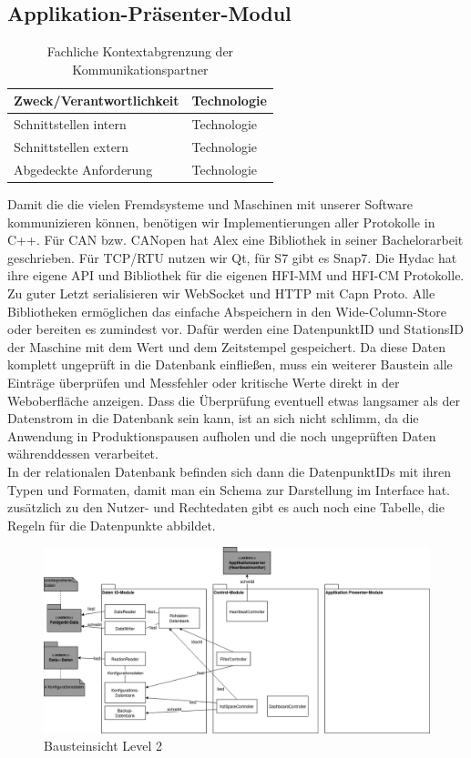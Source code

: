 \subsection{Applikation-Präsenter-Modul}
\begin{table}[th]
	\begin{tabularx}{\textwidth}{X X}
		\hline
		Zweck/Verantwortlichkeit & Technologie \\
		\hline
		Schnittstellen intern & Technologie \\
		\hline
		Schnittstellen extern & Technologie \\
		\hline
		Abgedeckte Anforderung & Technologie \\
		\hline
	\end{tabularx} 
	\caption{Fachliche Kontextabgrenzung der Kommunikationspartner}
	\label{tab:FachlicheKontextabgrenzungDerKommunikationspartner}
\end{table}
Damit die die vielen Fremdsysteme und Maschinen mit unserer Software kommunizieren können, benötigen wir Implementierungen aller Protokolle in C++. Für CAN bzw. CANopen hat Alex eine Bibliothek in seiner Bachelorarbeit geschrieben. Für TCP/RTU nutzen wir Qt, für S7 gibt es Snap7. Die Hydac hat ihre eigene API und Bibliothek für die eigenen HFI-MM und HFI-CM Protokolle. Zu guter Letzt serialisieren wir WebSocket und HTTP mit Capn Proto. Alle Bibliotheken ermöglichen das einfache Abspeichern in den Wide-Column-Store oder bereiten es zumindest vor. Dafür werden eine DatenpunktID und StationsID der Maschine mit dem Wert und dem Zeitstempel gespeichert. Da diese Daten komplett ungeprüft in die Datenbank einfließen, muss ein weiterer Baustein alle Einträge überprüfen und Messfehler oder kritische Werte direkt in der Weboberfläche anzeigen. Dass die Überprüfung eventuell etwas langsamer als der Datenstrom in die Datenbank sein kann, ist an sich nicht schlimm, da die Anwendung in Produktionspausen aufholen und die noch ungeprüften Daten währenddessen verarbeitet.\\
In der relationalen Datenbank befinden sich dann die DatenpunktIDs mit ihren Typen und Formaten, damit man ein Schema zur Darstellung im Interface hat. zusätzlich zu den Nutzer- und Rechtedaten gibt es auch noch eine Tabelle, die Regeln für die Datenpunkte abbildet.\\
\begin{figure}[h]
	\centering
	\includegraphics[width=1\textwidth]{Graphics/bausteinansicht_ebene_2.png}
	\caption{Bausteinsicht Level 2}
	\label{fig:bausteinsichtlvl2}
\end{figure}
